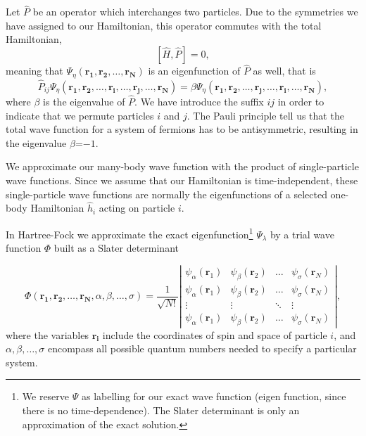 Let $\hat{P}$ be an operator which interchanges two particles. Due to the symmetries we have assigned to our Hamiltonian, this operator commutes with the total Hamiltonian,
\begin{equation}
  \nonumber
[\hat{H},\hat{P}]=0,
\end{equation}
meaning that $\Psi_\eta (\mathbf{r_1},\mathbf{r_2},\dots, \mathbf{r_N})$ is an eigenfunction of $\hat{P}$ as well, that is
\begin{equation}
  \nonumber
  \hat{P}_{ij} \Psi_\eta (\mathbf{r_1},\mathbf{r_2},\dots,\mathbf{r_i},\dots,\mathbf{r_j},\dots,\mathbf{r_N})= \beta \Psi_\eta (\mathbf{r_1},\mathbf{r_2},\dots,\mathbf{r_j},\dots,\mathbf{r_i},\dots,\mathbf{r_N}),
\end{equation}
where $\beta$ is the eigenvalue of $\hat{P}$. We have introduce the suffix $ij$ in order to indicate that we permute particles $i$ and $j$. The Pauli principle tell us that the total wave function for a system of fermions has to be antisymmetric, resulting in the eigenvalue $\beta$=$-1$. %

We approximate our many-body wave function with the product of single-particle wave functions. Since we assume that our Hamiltonian is time-independent, these single-particle wave functions are normally the eigenfunctions of a selected one-body Hamiltonian $\hat{h}_i$ acting on particle $i$.

In Hartree-Fock we approximate the exact eigenfunction\footnote[1]{We reserve $\Psi$ as labelling for our exact wave function (eigen function, since there is no time-dependence). The Slater determinant is only an approximation of the exact solution.} $\Psi_\lambda$ by a trial wave function $\Phi$ built as a Slater determinant

\begin{equation}
\label{eq:HartreeFockDet}
\Phi(\mathbf{r_1},\mathbf{r_2},\dots,\mathbf{r_N},\alpha,\beta,\dots,\sigma)= \frac{1}{\sqrt{N!}}\left|
 \begin{array}{cccc}
  \psi_{\alpha}(\mathbf{r}_1)&\psi_{\beta}(\mathbf{r}_2)&\dots&\psi_{\sigma}(\mathbf{r}_N) \\ [4pt]
  \psi_{\alpha}(\mathbf{r}_1)&\psi_{\beta}(\mathbf{r}_2)&\dots&\psi_{\sigma}(\mathbf{r}_N) \\[4pt]
  \vdots              & \vdots            &\ddots&\vdots\\[4pt]
  \psi_{\alpha}(\mathbf{r}_1)&\psi_{\beta}(\mathbf{r}_2)&\dots&\psi_{\sigma}(\mathbf{r}_N)
 \end{array}
 \right|,
\end{equation}
where the variables $\mathbf{r_i}$ include the coordinates of spin and space of particle $i$, and $\alpha,\beta,\dots,\sigma$ encompass all possible quantum numbers needed to specify a particular system.
 
